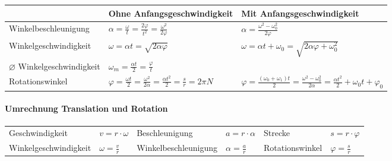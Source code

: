 \begin{tabbing}
	\begin{tabu} to \linewidth {l X X}
		\toprule
		& Ohne Anfangsgeschwindigkeit & Mit Anfangsgeschwindigkeit \\
		\midrule
		Winkelbeschleunigung & 
		$\alpha = \frac{\omega}{t} = \frac{2 \varphi}{t^2} = \frac{\omega^2}{2 \varphi}$ &
		$\alpha = \frac{\omega^2 - \omega_0^2}{2 \varphi}$ \\
		Winkelgeschwindigkeit & 
		$\omega = \alpha t = \sqrt{2 \alpha \varphi}$ &
		$\omega = \alpha t + \omega_0 = \sqrt{2\alpha \varphi + \omega_0^2} $ \\
		$\varnothing$ Winkelgeschwindigkeit & 
		$\omega_m = \frac{\alpha t}{2} = \frac{\varphi}{t}$ & \\
		Rotationswinkel & 
		$\varphi = \frac{\omega t}{2} = \frac{\omega^2}{2 \alpha} = \frac{\alpha t^2}{2} = \frac{s}{r} = 2\pi N$ &
		$\varphi = \frac{(\omega_0 + \omega_1)t}{2} = \frac{\omega^2 - \omega_0^2}{2 \alpha} = \frac{\alpha t^2}{2} + \omega_0 t + \varphi_0$ \\
	\end{tabu}
\end{tabbing}

\paragraph{Umrechnung Translation und Rotation}

\begin{tabbing}
	\begin{tabu} to \linewidth {l X l X l X}
		\toprule
		Geschwindigkeit & $v = r \cdot \omega$ &
		Beschleunigung & $a = r \cdot \alpha$ &
		Strecke & $s = r \cdot \varphi$ \\
		Winkelgeschwindigkeit & $\omega = \frac{v}{r}$ &
		Winkelbeschleunigung & $\alpha = \frac{a}{r}$ &
		Rotationswinkel & $\varphi = \frac{s}{r}$ \\
		\bottomrule
	\end{tabu}
\end{tabbing}

